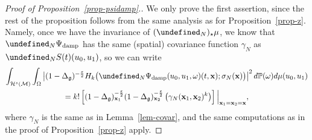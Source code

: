 \documentclass[AHL,Unicode,longabstracts,published]{cedram}
\newcommand{\damp}{\textup{damp}}
\newcommand{\Prob}{\mathbb{P}}
\let\P= \undefined
\newcommand{\P}{\mathbf{P}}
\newcommand{\x}{\mathbf{x}}
\newcommand{\M}{\mathcal{M}}
\renewcommand{\H}{\mathcal{H}}
\newcommand{\g}{\mathfrak{g}}
\newcommand{\Dlg}{\Delta_{\g}}
\newcommand{\eps}{\varepsilon}
\newcommand{\s}{\sigma}
\renewcommand{\o}{\omega}
\renewcommand{\O}{\Omega}
\begin{document}
\begin{proof}[Proof of Proposition~\ref{prop-psidamp}.]
We only prove the first assertion, since the rest of the proposition follows from the same analysis as for Proposition~\ref{prop-z}. Namely, once we have the invariance of $(\P_N)_{\star}\mu$, we know that $\P_N\Psi_{\damp}$ has the same (spatial) covariance function $\gamma_N$ as $\P_NS(t)(u_0,u_1)$, so we can write
\begin{multline*}
\int_{\H^s(\M)}\int_\O\left|(1-\Dlg)^{-\frac\eps2}H_k\big(\P_N\Psi_{\damp}(u_0,u_1,\o)(t,\x);\s_N(\x)\big)\right|^2d\Prob(\o) d\mu(u_0,u_1)\\
 =k!\left[(1-\Dlg)_{\x_1}^{-\frac\eps2}(1-\Dlg)_{\x_2}^{-\frac\eps2}\left(\gamma_N(\x_1,\x_2)^k\right)\right]\Big|_{\x_1=\x_2=\x},
\end{multline*}
where $\gamma_N$ is the same as in Lemma~\ref{lem-covar}, and the same computations as in the proof of Proposition~\ref{prop-z} apply.


\end{proof}
\end{document}
